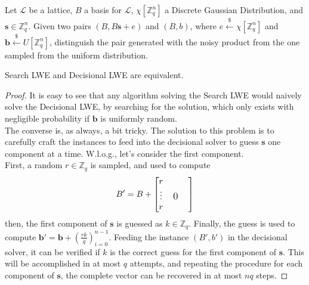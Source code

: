 \begin{definition}
Let $\mathscr{L}$ be a lattice, $B$ a basis for $\mathscr{L}$, $\chi[\mathbb{Z}_q^n]$ a Discrete Gaussian Distribution, and $\mathbf{s}\in\mathbb{Z}_q^n$. Given two pairs $(B, B\mathbf{s}+e)$ and $(B,b)$, where $e\xleftarrow{\$}\chi[\mathbb{Z}_q^n]$ and $\mathbf{b}\xleftarrow{\$}U[\mathbb{Z}_q^n]$, distinguish the pair generated with the noisy product from the one sampled from the uniform distribution.
\end{definition}

\begin{theorem}
Search LWE and Decisional LWE are equivalent.
\end{theorem}
\begin{proof}
It is easy to see that any algorithm solving the Search LWE would naively solve the Decisional LWE, by searching for the solution, which only exists with negligible probability if $\mathbf{b}$ is uniformly random.\\
The converse is, as always, a bit tricky. The solution to this problem is to carefully craft the instances to feed into the decisional solver to guess $\mathbf{s}$ one component at a time.
W.l.o.g., let's consider the first component.\\
First, a random $r\in\mathbb{Z}_q$ is sampled, and used to compute
\begin{equation*}
B'=B+
\begin{bmatrix}
r &&&\\
\vdots &  \multicolumn{2}{c}{\text{\large0}}\\
r &&& \\
\end{bmatrix}
\end{equation*}
then, the first component of $\mathbf{s}$ is guessed as $k\in\mathbb{Z}_q$. Finally, the guess is used to compute $\mathbf{b}'=\mathbf{b}+\left(\frac{rk}{q}\right)_{i=0}^{n-1}$. Feeding the instance $(B',b')$ in the decisional solver, it can be verified if $k$ is the correct guess for the first component of $\mathbf{s}$. This will be accomplished in at most $q$ attempts, and repeating the procedure for each component of $\mathbf{s}$, the complete vector can be recovered in at most $nq$ steps.
\end{proof}


